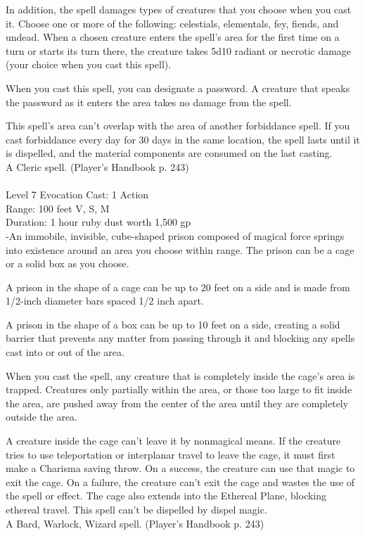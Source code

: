 \documentclass[10pt,twocolumn]{report}
\begin{document}
In addition, the spell damages types of creatures that you choose when you cast it. Choose one or more of the following: celestials, elementals, fey, fiends, and undead. When a chosen creature enters the spell’s area for the first time on a turn or starts its turn there, the creature takes 5d10 radiant or necrotic damage (your choice when you cast this spell).

When you cast this spell, you can designate a password. A creature that speaks the password as it enters the area takes no damage from the spell.

This spell’s area can’t overlap with the area of another forbiddance spell. If you cast forbiddance every day for 30 days in the same location, the spell lasts until it is dispelled, and the material components are consumed on the last casting.\\
A Cleric spell. (Player's Handbook p. 243) \\


 \\
Level 7 \quad Evocation \quad Cast: 1 Action\\
Range: 100 feet \quad V, S, M\\
Duration: 1 hour \quad ruby dust worth 1,500 gp\\
-An immobile, invisible, cube-shaped prison composed of magical force springs into existence around an area you choose within range. The prison can be a cage or a solid box as you choose.

A prison in the shape of a cage can be up to 20 feet on a side and is made from 1/2-inch diameter bars spaced 1/2 inch apart.

A prison in the shape of a box can be up to 10 feet on a side, creating a solid barrier that prevents any matter from passing through it and blocking any spells cast into or out of the area.

When you cast the spell, any creature that is completely inside the cage’s area is trapped. Creatures only partially within the area, or those too large to fit inside the area, are pushed away from the center of the area until they are completely outside the area.

A creature inside the cage can’t leave it by nonmagical means. If the creature tries to use teleportation or interplanar travel to leave the cage, it must first make a Charisma saving throw. On a success, the creature can use that magic to exit the cage. On a failure, the creature can’t exit the cage and wastes the use of the spell or effect. The cage also extends into the Ethereal Plane, blocking ethereal travel.
This spell can’t be dispelled by dispel magic.\\
A Bard, Warlock, Wizard spell. (Player's Handbook p. 243) \\
\end{document}

